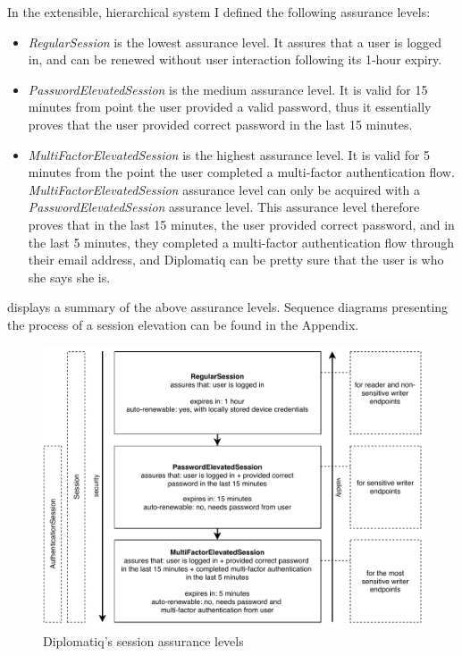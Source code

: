 In the extensible, hierarchical system I defined the following assurance levels:

\begin{itemize}
\item \emph{RegularSession} is the lowest assurance level. It assures that a user is logged in, and can be renewed without user interaction following its 1-hour expiry.
\item \emph{PasswordElevatedSession} is the medium assurance level. It is valid for 15 minutes from point the user provided a valid password, thus it essentially proves that the user provided correct password in the last 15 minutes.
\item \emph{MultiFactorElevatedSession} is the highest assurance level. It is valid for 5 minutes from the point the user completed a multi-factor authentication flow. \emph{MultiFactorElevatedSession} assurance level can only be acquired with a \emph{PasswordElevatedSession} assurance level. This assurance level therefore proves that in the last 15 minutes, the user provided correct password, and in the last 5 minutes, they completed a multi-factor authentication flow through their email address, and Diplomatiq can be pretty sure that the user is who she says she is.
\end{itemize}

 displays a summary of the above assurance levels. Sequence diagrams presenting the process of a session elevation can be found in the Appendix.

\begin{figure}[!htb]
    \centering
    \includegraphics[width=\textwidth-1.5cm]{figures/session-assurance-levels.pdf}
    \caption{Diplomatiq's session assurance levels}
    \label{fig:session-assurance-levels}
\end{figure}

